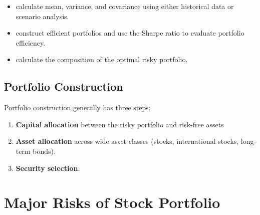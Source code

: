 \documentclass[
]{book}
\providecommand{\tightlist}{%
  \setlength{\itemsep}{0pt}\setlength{\parskip}{0pt}}
\begin{document}
\begin{itemize}
\item
  calculate mean, variance, and covariance using either historical data or scenario analysis.
\item
  construct efficient portfolios and use the Sharpe ratio to evaluate portfolio efficiency.
\item
  calculate the composition of the optimal risky portfolio.
\end{itemize}

\hypertarget{portfolio-construction-1}{%
\subsection{Portfolio Construction}\label{portfolio-construction-1}}

Portfolio construction generally has three steps:

\begin{enumerate}
\def\labelenumi{\arabic{enumi}.}
\tightlist
\item
  \textbf{Capital allocation} between the risky portfolio and risk-free assets
\item
  \textbf{Asset allocation} across wide asset classes (stocks, international stocks, long-term bonds).
\item
  \textbf{Security selection}.
\end{enumerate}

\hypertarget{major-risks-of-stock-portfolio}{%
\section{Major Risks of Stock Portfolio}\label{major-risks-of-stock-portfolio}}
\end{document}
